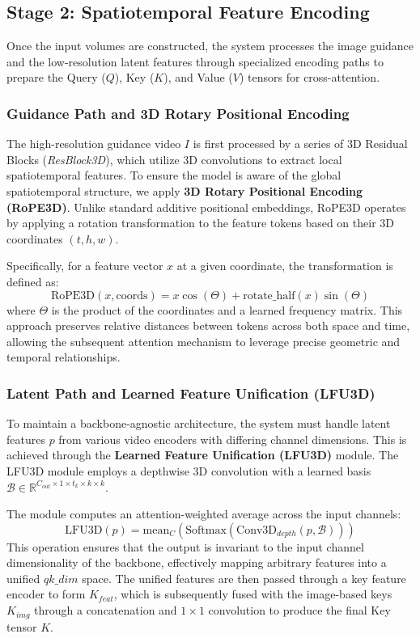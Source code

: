 \subsection{Stage 2: Spatiotemporal Feature Encoding}

Once the input volumes are constructed, the system processes the image guidance and the low-resolution latent features through specialized encoding paths to prepare the Query ($Q$), Key ($K$), and Value ($V$) tensors for cross-attention.

\subsubsection{Guidance Path and 3D Rotary Positional Encoding}
The high-resolution guidance video $I$ is first processed by a series of 3D Residual Blocks (\textit{ResBlock3D}), which utilize 3D convolutions to extract local spatiotemporal features. To ensure the model is aware of the global spatiotemporal structure, we apply \textbf{3D Rotary Positional Encoding (RoPE3D)}. Unlike standard additive positional embeddings, RoPE3D operates by applying a rotation transformation to the feature tokens based on their 3D coordinates $(t, h, w)$. 

Specifically, for a feature vector $x$ at a given coordinate, the transformation is defined as:
\begin{equation}
    \text{RoPE3D}(x, \text{coords}) = x \cos(\Theta) + \text{rotate\_half}(x) \sin(\Theta)
\end{equation}
where $\Theta$ is the product of the coordinates and a learned frequency matrix. This approach preserves relative distances between tokens across both space and time, allowing the subsequent attention mechanism to leverage precise geometric and temporal relationships.

\subsubsection{Latent Path and Learned Feature Unification (LFU3D)}
To maintain a backbone-agnostic architecture, the system must handle latent features $p$ from various video encoders with differing channel dimensions. This is achieved through the \textbf{Learned Feature Unification (LFU3D)} module. The LFU3D module employs a depthwise 3D convolution with a learned basis $\mathcal{B} \in \mathbb{R}^{C_{out} \times 1 \times t_k \times k \times k}$. 

The module computes an attention-weighted average across the input channels:
\begin{equation}
    \text{LFU3D}(p) = \text{mean}_{C} \left( \text{Softmax}(\text{Conv3D}_{depth}(p, \mathcal{B})) \right)
\end{equation}
This operation ensures that the output is invariant to the input channel dimensionality of the backbone, effectively mapping arbitrary features into a unified $qk\_dim$ space. The unified features are then passed through a key feature encoder to form $K_{feat}$, which is subsequently fused with the image-based keys $K_{img}$ through a concatenation and $1 \times 1$ convolution to produce the final Key tensor $K$.
